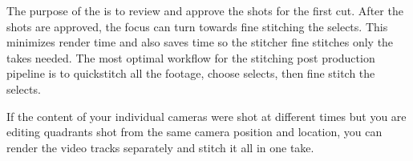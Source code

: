 \begin{fullwidth}
The purpose of the \textbf{} is to review and approve the shots for the first cut. After the shots are approved, the focus can turn towards fine stitching the selects. This minimizes render time and also saves time so the stitcher fine stitches only the takes needed. The most optimal workflow for the stitching post production pipeline is to quickstitch all the footage, choose selects, then fine stitch the selects.

\tip If the content of your individual cameras were shot at different times but you are editing quadrants shot from the same camera position and location, you can render the video tracks separately and stitch it all in one take.

\clearpage
\end{fullwidth}